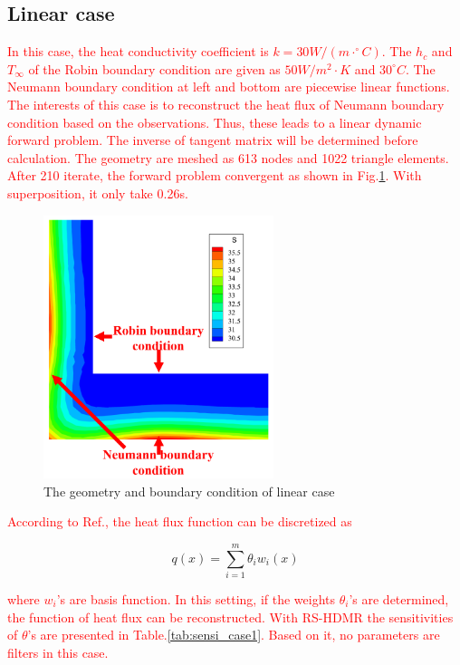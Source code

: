 \documentclass[review]{elsarticle}
\begin{document}
\subsection{Linear case}
\textcolor{red}{In this case, the heat conductivity coefficient is $k = 30W/(m\cdot ^\circ C)$. The $h_c$ and $T_\infty$ of the Robin boundary condition are given as $50W/m^2\cdot K$ and $30^{\circ}C$. The Neumann boundary condition at left and bottom are piecewise linear functions. The interests of this case is to reconstruct the heat flux of Neumann boundary condition based on the observations. Thus, these leads to a linear dynamic forward problem. The inverse of tangent matrix will be determined before calculation. The geometry are meshed as 613 nodes and 1022 triangle elements. After 210 iterate, the forward problem convergent as shown in Fig.\ref{fig:linearcase}. With superposition, it only take 0.26s.} 
 
 \begin{figure}
    \centering
    \includegraphics[width = 0.6\textwidth]{fig/case1-geo.png}
    \caption{The geometry and boundary condition of linear case}
    \label{fig:linearcase}
\end{figure}

 \textcolor{red}{According to Ref.\cite{wang2004bayesian}, the heat flux function can be discretized as}

\begin{equation}
    q(x) = \sum_{i=1}^m \theta_i w_i(x)
    \label{eq:functionheatflux}
\end{equation}

\noindent \textcolor{red}{where $w_i$'s are basis function. In this setting, if the weights $\theta_i$'s are determined, the function of heat flux can be reconstructed. With RS-HDMR the sensitivities of $\theta$'s are presented in Table.\ref{tab:sensi_case1}. Based on it, no parameters are filters in this case.}
\end{document}
